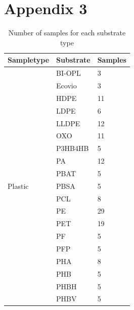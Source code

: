 \chapter{Appendix 3}
\vspace{-1cm}
\begin{table}[H]
\caption{Number of samples for each substrate type}
\label{substrate_sampletype}
\begin{tabular}{@{}lll@{}}
\toprule
\textbf{Sampletype}           & \textbf{Substrate} & \textbf{Samples} \\ \midrule
\multirow{26}{*}{Plastic}     & BI-OPL             & 3          \\
                              & Ecovio             & 3          \\
                              & HDPE               & 11         \\
                              & LDPE               & 6          \\
                              & LLDPE              & 12         \\
                              & OXO                & 11         \\
                              & P3HB4HB            & 5          \\
                              & PA                 & 12         \\
                              & PBAT               & 5          \\
                              & PBSA               & 5          \\
                              & PCL                & 8          \\
                              & PE                 & 29         \\
                              & PET                & 19         \\
                              & PF                 & 5          \\
                              & PFP                & 5          \\
                              & PHA                & 8          \\
                              & PHB                & 5          \\
                              & PHBH               & 5          \\
                              & PHBV               & 5          \\

\end{tabular}
\end{table}
